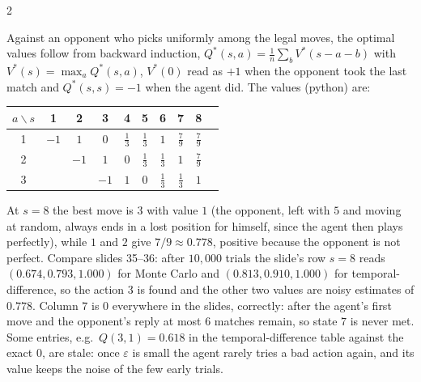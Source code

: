 \begin{paracol}{2}
\begin{example}\label{ch16:ex-nim}
Against an opponent who picks uniformly among the legal moves, the optimal values follow from backward induction, $Q^*(s,a)=\frac1{n}\sum_{b}V^*(s-a-b)$ with $V^*(s)=\max_aQ^*(s,a)$, $V^*(0)$ read as $+1$ when the opponent took the last match
and $Q^*(s,s)=-1$ when the agent did. The values (python) are:
\begin{center}\small
\begin{tabular}{@{}c|ccccccccc@{}}
$a\backslash s$ & 1 & 2 & 3 & 4 & 5 & 6 & 7 & 8\\ \hline
1 & $-1$ & $1$ & $0$ & $\tfrac13$ & $\tfrac13$ & $1$ & $\tfrac79$ & $\tfrac79$\\
2 &  & $-1$ & $1$ & $0$ & $\tfrac13$ & $\tfrac13$ & $1$ & $\tfrac79$\\
3 &  &  & $-1$ & $1$ & $0$ & $\tfrac13$ & $\tfrac13$ & $1$\\
\end{tabular}
\end{center}
At $s=8$ the best move is $3$ with value $1$ (the opponent, left with $5$ and moving at random, always ends in a lost position for himself, since the agent then plays perfectly), while $1$ and $2$ give $7/9\approx0.778$, positive because the opponent is not perfect. Compare slides 35--36:
after $10{,}000$ trials the slide's row $s=8$ reads $(0.674,0.793,1.000)$ for Monte Carlo and $(0.813,0.910,1.000)$ for temporal-difference, so the action $3$ is found and the other two values are noisy estimates of $0.778$. Column $7$ is $0$ everywhere in the slides, correctly: after the agent's first move and the opponent's reply at most $6$ matches remain, so state $7$ is never met.
Some entries, e.g.\ $Q(3,1)=0.618$ in the temporal-difference table against the exact $0$, are stale: once $\varepsilon$ is small the agent rarely tries a bad action again, and its value keeps the noise of the few early trials.
\end{example}
\begin{figure}[ht]
\centering
{}
\end{figure}
\end{paracol}
